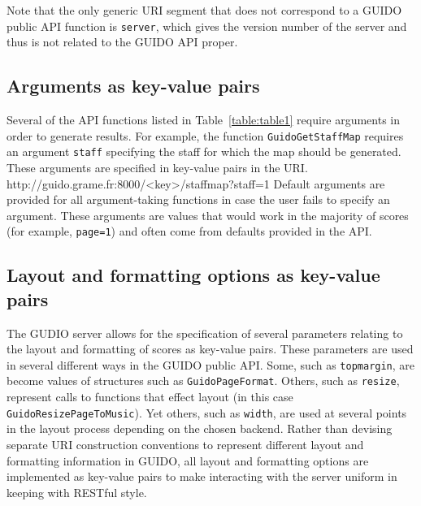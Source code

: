 \documentclass[11pt,a4paper]{article}
\newenvironment{code}		{\vspace{-2mm} \fontsize{8.5pt}{12pt}\selectfont \verbatim}{\endverbatim\vspace{-2mm}}
\begin{document}
Note that the only generic URI segment that does not correspond to a GUIDO public API function is \verb=server=, which gives the version number of the server and thus is not related to the GUIDO API proper.


\subsection{Arguments as key-value pairs}
Several of the API functions listed in Table~\ref{table:table1} require arguments in order to generate results.  For example, the function \verb=GuidoGetStaffMap= requires an argument \verb=staff= specifying the staff for which the map should be generated.  These arguments are specified in key-value pairs in the URI.
\begin{code}
 http://guido.grame.fr:8000/<key>/staffmap?staff=1
\end{code}
Default arguments are provided for all argument-taking functions in case the user fails to specify an argument.  These arguments are values that would work in the majority of scores (for example, \verb&page=1&) and often come from defaults provided in the API.
\subsection{Layout and formatting options as key-value pairs}
The GUDIO server allows for the specification of several parameters relating to the layout and formatting of scores as key-value pairs.  These parameters are used in several different ways in the GUIDO public API.  Some, such as \verb=topmargin=, are become values of structures such as \verb=GuidoPageFormat=.  Others, such as \verb=resize=, represent calls to functions that effect layout (in this case \break \verb=GuidoResizePageToMusic=).  Yet others, such as \break \verb=width=, are used at several points in the layout process depending on the chosen backend.  Rather than devising separate URI construction conventions to represent different layout and formatting information in GUIDO, all layout and formatting options are implemented as key-value pairs to make interacting with the server uniform in keeping with RESTful style.\par
\end{document}
